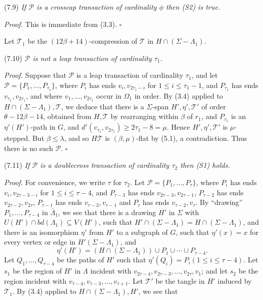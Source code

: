 \stmt
(7.9) \textit{If $\mathscr{P}$ is a crosscap transaction of cardinality $\phi$ then (S2) is true.}

\textit{Proof.} This is immediate from (3.3). $\square$

Let $\mathscr{T}_1$ be the $(12\beta + 14)$-compression of $\mathscr{T}$ in $H \cap (\Sigma - \Lambda_1)$.

\stmt
(7.10) \textit{$\mathscr{P}$ is not a leap transaction of cardinality $\tau_1$.}

\textit{Proof.} Suppose that $\mathscr{P}$ is a leap transaction of cardinality $\tau_1$, and let $\mathscr{P} = \{P_1, \dots, P_{\tau_1}\}$, where $P_i$ has ends $v_i, v_{2\tau_1 - i}$ for $1 \le i \le \tau_1 - 1$, and $P_{\tau_1}$ has ends $v_{\tau_1}, v_{2\tau_1}$, and where $v_1, \dots, v_{2\tau_1}$ occur in $\Omega_1$ in order. By (3.4) applied to $H \cap (\Sigma - \Lambda_1), \mathscr{T}$, we deduce that there is a $\Sigma$-span $H', \eta', \mathscr{T}'$ of order $\theta - 12\beta - 14$, obtained from $H, \mathscr{T}$ by rearranging within $\beta$ of $r_1$, and $P_{\tau_1}$ is an $\eta'(H')$-path in $G$, and $d'(v_{\tau_1}, v_{2\tau_1}) \ge 2\tau_1 - 8 = \mu$. Hence $H', \eta', \mathscr{T}'$ is $\mu$-stepped. But $\beta \le \lambda$, and so $H \mathscr{T}$ is $(\beta, \mu)$-flat by (5.1), a contradiction. Thus there is no such $\mathscr{P}$. $\square$

\stmt
(7.11) \textit{If $\mathscr{P}$ is a doublecross transaction of cardinality $\tau_2$ then (S1) holds.}

\textit{Proof.} For convenience, we write $\tau$ for $\tau_2$. Let $\mathscr{P} = \{P_1, \dots, P_\tau\}$, where $P_i$ has ends $v_i, v_{2\tau - 3 - i}$ for $1 \le i \le \tau - 4$, and $P_{\tau - 3}$ has ends $v_{2\tau - 3}, v_{2\tau - 1}$, $P_{\tau - 2}$ has ends $v_{2\tau - 2}, v_{2\tau}$, $P_{\tau - 1}$ has ends $v_{\tau - 3}, v_{\tau - 1}$ and $P_\tau$ has ends $v_{\tau - 2}, v_\tau$. By ``drawing'' $P_1, \dots, P_{\tau - 4}$ in $\bar{\Lambda}_1$, we see that there is a drawing $H'$ in $\Sigma$ with $U(H') \cap bd(\Lambda_1) \subseteq V(H')$, such that $H' \cap (\Sigma - \Lambda_1) = H \cap (\Sigma - \Lambda_1)$, and there is an isomorphism $\eta'$ from $H'$ to a subgraph of $G$, such that $\eta'(x) = x$ for every vertex or edge in $H'(\Sigma - \Lambda_1)$, and
\begin{equation*}
\eta'(H') = (H \cap (\Sigma - \Lambda_1)) \cup P_1 \cup \cdots \cup P_{\tau - 4}.
\end{equation*}
Let $Q_1, \dots, Q_{\tau - 4}$ be the paths of $H'$ such that $\eta'(Q_i) = P_i (1 \le i \le \tau - 4)$. Let $s_1$ be the region of $H'$ in $\Lambda$ incident with $v_{2\tau - 4}, v_{2\tau - 3}, \dots, v_{2\tau}, v_1$; and let $s_2$ be the region incident with $v_{\tau - 4}, v_{\tau - 3}, \dots, v_{\tau + 1}$. Let $\mathscr{T}'$ be the tangle in $H'$ induced by $\mathscr{T}_1$. By (3.4) applied to $H \cap (\Sigma - \Lambda_1), H'$, we see that

